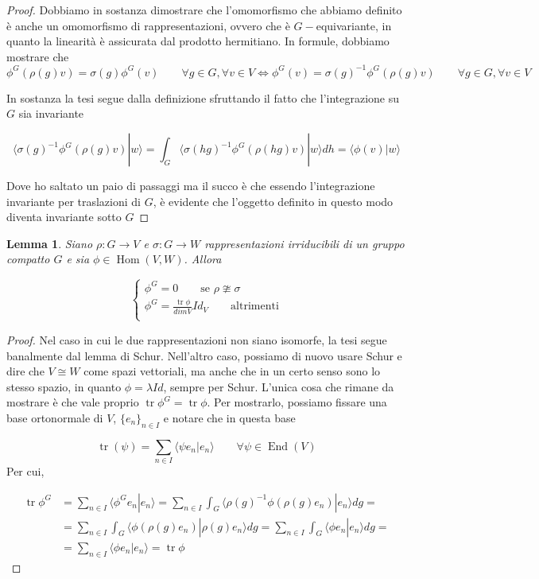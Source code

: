 \documentclass[11pt]{article}
\theoremstyle{plain}
\newtheorem{lemma}[thm]{Lemma}
\theoremstyle{definition}
\theoremstyle{remark}
\newcommand{\dsum}{\displaystyle\sum}
\newcommand{\dint}{\displaystyle\int}
\DeclareMathOperator{\tr}{tr}
\DeclareMathOperator{\Hom}{Hom}
\DeclareMathOperator{\End}{End}
\begin{document}
 \begin{proof}
   Dobbiamo in sostanza dimostrare che l'omomorfismo che abbiamo definito è anche un omomorfismo di rappresentazioni, ovvero che è $G-$equivariante, in quanto la linearità è assicurata dal prodotto hermitiano. In formule, dobbiamo mostrare che
   \[ \phi^G (\rho(g) v) = \sigma(g) \phi^G(v) \qquad \forall g \in G, \forall v \in V \Leftrightarrow \phi^G(v) = \sigma(g) ^{-1} \phi^G(\rho(g) v) \qquad \forall g \in G, \forall v \in V \]

   In sostanza la tesi segue dalla definizione sfruttando il fatto che l'integrazione su $G$ sia invariante


   \[ \langle \sigma(g) ^{-1} \phi^G(\rho(g) v) | w \rangle  = \dint_G \langle \sigma(hg) ^{-1} \phi^G(\rho(hg) v) | w \rangle dh = \langle \phi(v) | w \rangle\]

   Dove ho saltato un paio di passaggi ma il succo è che essendo l'integrazione invariante per traslazioni di $G$, è evidente che l'oggetto definito in questo modo diventa invariante sotto $G$
 \end{proof}

 \begin{lemma}
   Siano $\rho: G \to V$ e $\sigma: G \to W$ rappresentazioni irriducibili di un gruppo compatto $G$ e sia $\phi \in \Hom(V, W)$. Allora

   \[
   \begin{cases}
     \phi^G = 0 \qquad \text{se } \rho \ncong \sigma \\
     \phi^G = \frac{\tr \phi}{dim V}Id_V \qquad \text{altrimenti} \\
   \end{cases}
   \]

 \end{lemma}

 \begin{proof}
   Nel caso in cui le due rappresentazioni non siano isomorfe, la tesi segue banalmente dal lemma di Schur. Nell'altro caso, possiamo di nuovo usare Schur e dire che $V \cong W$ come spazi vettoriali, ma anche che in un certo senso sono lo stesso spazio, in quanto $\phi = \lambda Id$, sempre per Schur. L'unica cosa che rimane da mostrare è che vale proprio $\tr \phi^G = \tr \phi$. Per mostrarlo, possiamo fissare una base ortonormale di $V$, $\{ e_n\}_{n\in I}$ e notare che in questa base

   \[ \tr(\psi) = \dsum_{n \in I}\langle \psi e_n | e_n \rangle \qquad \forall \psi \in \End(V)\]
   Per cui,

   \begin{align*} \tr \phi^G &= \dsum_{n \in I}\langle \phi^G e_n | e_n \rangle = \dsum_{n \in I} \dint_G \langle \rho(g)^{-1} \phi(\rho(g) e_n) | e_n \rangle dg = \\
     &= \dsum_{n \in I}\dint_G \langle \phi(\rho(g) e_n) | \rho(g) e_n \rangle  dg = \dsum_{n \in I} \dint_G \langle \phi e_n |  e_n \rangle dg = \\
     &= \dsum_{n\in I} \langle \phi e_n | e_n \rangle = \tr \phi
   \end{align*}

   
 \end{proof}
\end{document}
